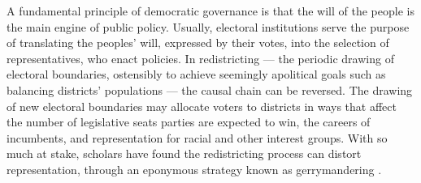 \documentclass[letter,12pt]{article}
\begin{document}
\begin{abstract}

\end{abstract}


\onehalfspacing

A fundamental principle of democratic governance is that the will of the people is the main engine of public policy. Usually, electoral institutions serve the purpose of translating the peoples' will, expressed by their votes, into the selection of representatives, who enact policies. In redistricting --- the periodic drawing of electoral boundaries, ostensibly to achieve seemingly apolitical goals such as balancing districts' populations --- the causal chain can be reversed. The drawing of new electoral boundaries may allocate voters to districts in ways that affect the number of legislative seats parties are expected to win, the careers of incumbents, and representation for racial and other interest groups. With so much at stake, scholars have found the redistricting process can distort representation, through an eponymous strategy known as gerrymandering \citep{mayhew1974vanishingMg,cox.katz.2002,erikson1972malapportionment,engstrom2006redisttrictApsr}. 
\end{document}
